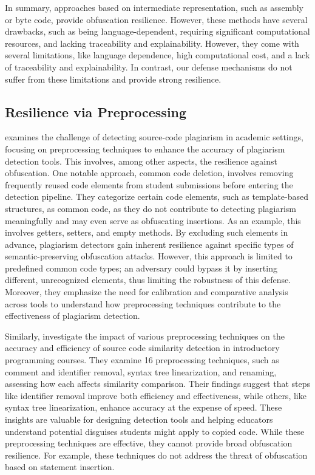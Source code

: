 In summary, approaches based on intermediate representation, such as assembly or byte code, provide obfuscation resilience.
However, these methods have several drawbacks, such as being language-dependent, requiring significant computational resources, and lacking traceability and explainability.
However, they come with several limitations, like language dependence, high computational cost, and a lack of traceability and explainability. In contrast, our defense mechanisms do not suffer from these limitations and provide strong resilience.

\subsection{Resilience via Preprocessing}

\citet{Novak2020} examines the challenge of detecting source-code plagiarism in academic settings, focusing on preprocessing techniques to enhance the accuracy of plagiarism detection tools.
This involves, among other aspects, the resilience against obfuscation.
One notable approach, common code deletion, involves removing frequently reused code elements from student submissions before entering the detection pipeline. They categorize certain code elements, such as template-based structures, as common code, as they do not contribute to detecting plagiarism meaningfully and may even serve as obfuscating insertions. 
As an example, this involves getters, setters, and empty methods.
By excluding such elements in advance, plagiarism detectors gain inherent resilience against specific types of semantic-preserving obfuscation attacks. However, this approach is limited to predefined common code types; an adversary could bypass it by inserting different, unrecognized elements, thus limiting the robustness of this defense.
Moreover, they emphasize the need for calibration and comparative analysis across tools to understand how preprocessing techniques contribute to the effectiveness of plagiarism detection.

Similarly, \citet{Karnalim2020} investigate the impact of various preprocessing techniques on the accuracy and efficiency of source code similarity detection in introductory programming courses. They examine 16 preprocessing techniques, such as comment and identifier removal, syntax tree linearization, and renaming, assessing how each affects similarity comparison. Their findings suggest that steps like identifier removal improve both efficiency and effectiveness, while others, like syntax tree linearization, enhance accuracy at the expense of speed. These insights are valuable for designing detection tools and helping educators understand potential disguises students might apply to copied code.
While these preprocessing techniques are effective, they cannot provide broad obfuscation resilience.
For example, these techniques do not address the threat of obfuscation based on statement insertion.

